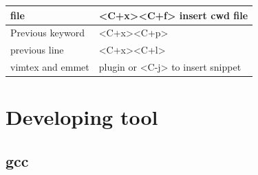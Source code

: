 \documentclass[a4paper,12pt,twoside]{book}
\begin{document}
\begin{itemize}
\begin{tabular}{p{}|p{}}
\hline 
file & <C+x><C+f> insert cwd file  \\ 

\hline
Previous keyword & <C+x><C+p> \\

\hline
previous line & <C+x><C+l> \\

\hline 
vimtex and emmet & plugin or <C-j> to insert snippet\\

\hline
\end{tabular}

\end{itemize}



\chapter{Developing tool}
\section{gcc}
\end{document}
